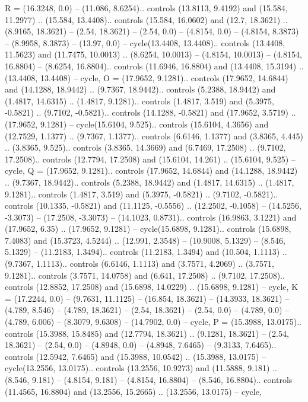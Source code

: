 {R} = {(16.3248, 0.0) -- (11.086, 8.6254).. controls (13.8113, 9.4192) and (15.584, 11.2977) .. (15.584, 13.4408).. controls (15.584, 16.0602) and (12.7, 18.3621) .. (8.9165, 18.3621) -- (2.54, 18.3621) -- (2.54, 0.0) -- (4.8154, 0.0) -- (4.8154, 8.3873) -- (8.9958, 8.3873) -- (13.97, 0.0) -- cycle(13.4408, 13.4408).. controls (13.4408, 11.5623) and (11.7475, 10.0013) .. (8.6254, 10.0013) -- (4.8154, 10.0013) -- (4.8154, 16.8804) -- (8.6254, 16.8804).. controls (11.6946, 16.8804) and (13.4408, 15.3194) .. (13.4408, 13.4408) -- cycle},
{O} = {(17.9652, 9.1281).. controls (17.9652, 14.6844) and (14.1288, 18.9442) .. (9.7367, 18.9442).. controls (5.2388, 18.9442) and (1.4817, 14.6315) .. (1.4817, 9.1281).. controls (1.4817, 3.519) and (5.3975, -0.5821) .. (9.7102, -0.5821).. controls (14.1288, -0.5821) and (17.9652, 3.5719) .. (17.9652, 9.1281) -- cycle(15.6104, 9.525).. controls (15.6104, 4.3656) and (12.7529, 1.1377) .. (9.7367, 1.1377).. controls (6.6146, 1.1377) and (3.8365, 4.445) .. (3.8365, 9.525).. controls (3.8365, 14.3669) and (6.7469, 17.2508) .. (9.7102, 17.2508).. controls (12.7794, 17.2508) and (15.6104, 14.261) .. (15.6104, 9.525) -- cycle},
{Q} = {(17.9652, 9.1281).. controls (17.9652, 14.6844) and (14.1288, 18.9442) .. (9.7367, 18.9442).. controls (5.2388, 18.9442) and (1.4817, 14.6315) .. (1.4817, 9.1281).. controls (1.4817, 3.519) and (5.3975, -0.5821) .. (9.7102, -0.5821).. controls (10.1335, -0.5821) and (11.1125, -0.5556) .. (12.2502, -0.1058) -- (14.5256, -3.3073) -- (17.2508, -3.3073) -- (14.1023, 0.8731).. controls (16.9863, 3.1221) and (17.9652, 6.35) .. (17.9652, 9.1281) -- cycle(15.6898, 9.1281).. controls (15.6898, 7.4083) and (15.3723, 4.5244) .. (12.991, 2.3548) -- (10.9008, 5.1329) -- (8.546, 5.1329) -- (11.2183, 1.3494).. controls (11.2183, 1.3494) and (10.504, 1.1113) .. (9.7367, 1.1113).. controls (6.6146, 1.1113) and (3.7571, 4.2069) .. (3.7571, 9.1281).. controls (3.7571, 14.0758) and (6.641, 17.2508) .. (9.7102, 17.2508).. controls (12.8852, 17.2508) and (15.6898, 14.0229) .. (15.6898, 9.1281) -- cycle},
{K} = {(17.2244, 0.0) -- (9.7631, 11.1125) -- (16.854, 18.3621) -- (14.3933, 18.3621) -- (4.789, 8.546) -- (4.789, 18.3621) -- (2.54, 18.3621) -- (2.54, 0.0) -- (4.789, 0.0) -- (4.789, 6.006) -- (8.3079, 9.6308) -- (14.7902, 0.0) -- cycle},
{P} = {(15.3988, 13.0175).. controls (15.3988, 15.8485) and (12.7794, 18.3621) .. (9.1281, 18.3621) -- (2.54, 18.3621) -- (2.54, 0.0) -- (4.8948, 0.0) -- (4.8948, 7.6465) -- (9.3133, 7.6465).. controls (12.5942, 7.6465) and (15.3988, 10.0542) .. (15.3988, 13.0175) -- cycle(13.2556, 13.0175).. controls (13.2556, 10.9273) and (11.5888, 9.181) .. (8.546, 9.181) -- (4.8154, 9.181) -- (4.8154, 16.8804) -- (8.546, 16.8804).. controls (11.4565, 16.8804) and (13.2556, 15.2665) .. (13.2556, 13.0175) -- cycle},
